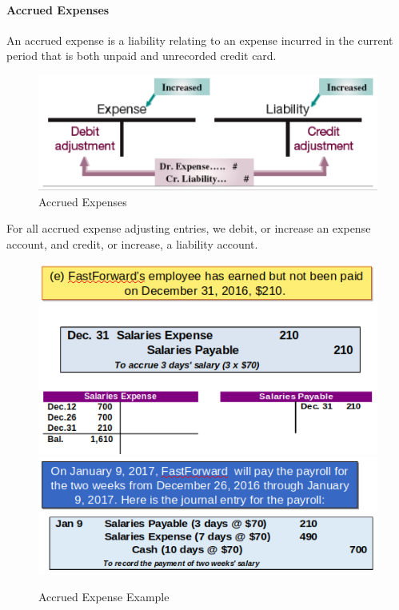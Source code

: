 \documentclass[../main.tex]{subfiles}
\begin{document}
	\paragraph{Accrued Expenses}
	
	An accrued expense is a liability relating to an expense incurred in the 
	current period that is both unpaid and unrecorded \eg credit card.
	
 	\begin{figure}[ht!]
		\centering
		\includegraphics[width=0.8\columnwidth]{images/c3/accured_expenses.png}
		\caption{Accrued Expenses}	
	\end{figure}
	
	For all accrued expense adjusting entries, we debit, or increase an expense 
	account, and credit, or increase, a liability account.
	
 	\begin{figure}[ht!]
		\centering
		\includegraphics[width=0.9\columnwidth]{images/c3/accured_expense_eg1.png}
		\includegraphics[width=0.9\columnwidth]{images/c3/accured_expense_eg2.png}
		\caption{Accrued Expense Example}	
	\end{figure}
	
\end{document}
